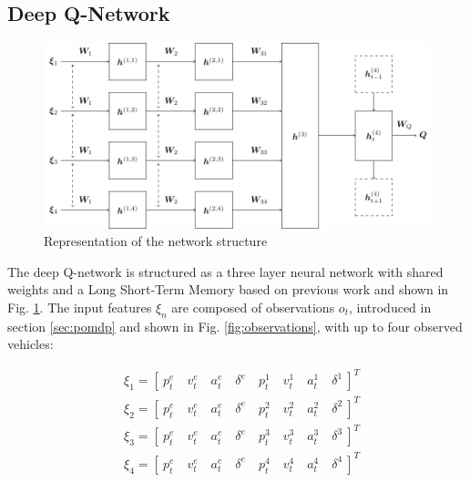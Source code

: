 \subsection{Deep Q-Network}
\begin{figure}[t]
	\centering
	\includegraphics[width=0.95\columnwidth]{figures/figures-network.pdf}
	\caption{Representation of the network structure}
	\label{fig:Network}
\end{figure}
\label{sec:q-learning}
The deep Q-network is structured as a three layer neural network with shared weights and a Long Short-Term Memory based on previous work \cite{Tram2018} and shown in Fig. \ref{fig:Network}. The input features $\xi_n$ are composed of observations $o_t$, introduced in section \ref{sec:pomdp} and shown in Fig. \ref{fig:observations}, with up to four observed vehicles: 

\begin{equation}
	\begin{aligned}
	&\xi_1 = [\  p^e_t \quad v^e_t \quad a^e_t \quad \delta^e \quad p^1_t \quad v^1_t \quad a^1_t \quad \delta^1 \  ]^T\\
	&\xi_2 = [\  p^e_t \quad v^e_t \quad a^e_t \quad \delta^e \quad p^2_t \quad v^2_t \quad a^2_t \quad \delta^2 \  ]^T\\
	&\xi_3 = [\  p^e_t \quad v^e_t \quad a^e_t \quad \delta^e \quad p^3_t \quad v^3_t \quad a^3_t \quad \delta^3 \  ]^T\\
	&\xi_4 = [\  p^e_t \quad v^e_t \quad a^e_t \quad \delta^e \quad p^4_t \quad v^4_t \quad a^4_t \quad \delta^4 \  ]^T\\
	\end{aligned}
\end{equation}


